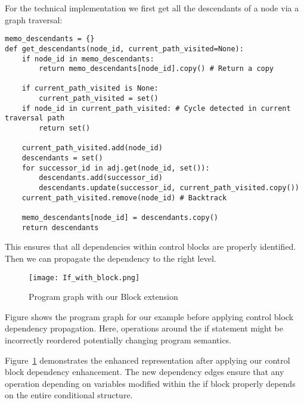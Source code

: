 \documentclass[%
thesis=student,%
coverpage=false,%
titlepage=false,%
headmarks=true, %
english,%
font=libertine, %
math=newpxtx, %
BCOR=5mm,%
coverBCOR=11mm%
]{tum-templates/book/tumbook}
\begin{document}
For the technical implementation we first get all the descendants of a node via a graph traversal:

\newpage
\begin{lstlisting}[style=pythonstyle, caption={Tracks descendants recursively}]
memo_descendants = {}
def get_descendants(node_id, current_path_visited=None):
    if node_id in memo_descendants:
        return memo_descendants[node_id].copy() # Return a copy

    if current_path_visited is None:
        current_path_visited = set()
    if node_id in current_path_visited: # Cycle detected in current traversal path
        return set()

    current_path_visited.add(node_id)
    descendants = set()
    for successor_id in adj.get(node_id, set()):
        descendants.add(successor_id)
        descendants.update(successor_id, current_path_visited.copy())
    current_path_visited.remove(node_id) # Backtrack

    memo_descendants[node_id] = descendants.copy()
    return descendants
\end{lstlisting}

This ensures that all dependencies within control blocks are properly identified. Then we can propagate the dependency to the right level.

\begin{figure}[htbp]
    \centering
    \texttt{[image: If\_with\_block.png]}
    \caption{Program graph with our Block extension}
    \label{fig:If_with_block}
\end{figure}


Figure  shows the program graph for our example before applying control block dependency propagation. Here, operations around the if statement might be incorrectly reordered potentially changing program semantics.

Figure~\ref{fig:If_with_block} demonstrates the enhanced representation after applying our control block dependency enhancement. The new dependency edges ensure that any operation depending on variables modified within the if block properly depends on the entire conditional structure.
\end{document}
